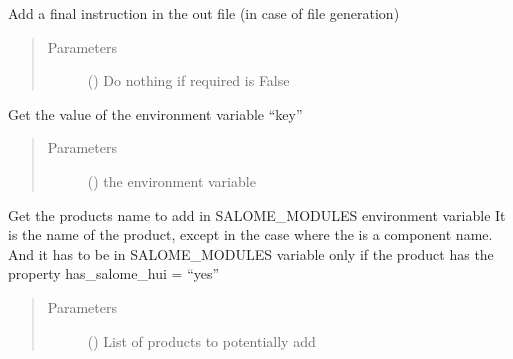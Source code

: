 \documentclass[a4paper,10pt,english]{sphinxmanual}
\begin{document}
\begin{fulllineitems}
\begin{fulllineitems}
\begin{quote}
\begin{description}
\end{description}\end{quote}

\end{fulllineitems}


\begin{fulllineitems}
\label{\detokenize{commands/apidoc/src:src.environment.SalomeEnviron.finish}}
Add a final instruction in the out file (in case of file generation)
\begin{quote}\begin{description}
\item[{Parameters}] \leavevmode
{} () \textendash{} Do nothing if required is False

\end{description}\end{quote}

\end{fulllineitems}


\begin{fulllineitems}
\label{\detokenize{commands/apidoc/src:src.environment.SalomeEnviron.get}}
Get the value of the environment variable “key”
\begin{quote}\begin{description}
\item[{Parameters}] \leavevmode
{} () \textendash{} the environment variable

\end{description}\end{quote}

\end{fulllineitems}


\begin{fulllineitems}
\label{\detokenize{commands/apidoc/src:src.environment.SalomeEnviron.get_names}}
Get the products name to add in SALOME\_MODULES environment variable
It is the name of the product, except in the case where the is a 
component name. And it has to be in SALOME\_MODULES variable only 
if the product has the property has\_salome\_hui = “yes”
\begin{quote}\begin{description}
\item[{Parameters}] \leavevmode
{} () \textendash{} List of products to potentially add


\end{description}
\end{quote}
\end{fulllineitems}
\end{fulllineitems}
\end{document}
